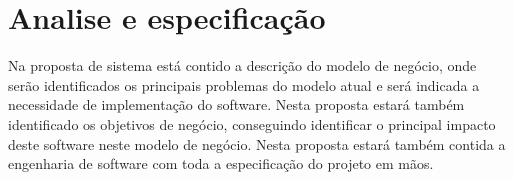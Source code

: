 
\chapter{Analise e especificação}

Na proposta de sistema está contido a descrição do modelo de negócio, onde serão identificados os principais
 problemas do modelo atual e será indicada a necessidade de implementação do software. Nesta proposta 
 estará também identificado os objetivos de negócio, conseguindo identificar o principal impacto deste 
 software neste modelo de negócio. Nesta proposta estará também contida a engenharia de software com toda 
 a especificação do projeto em mãos.
